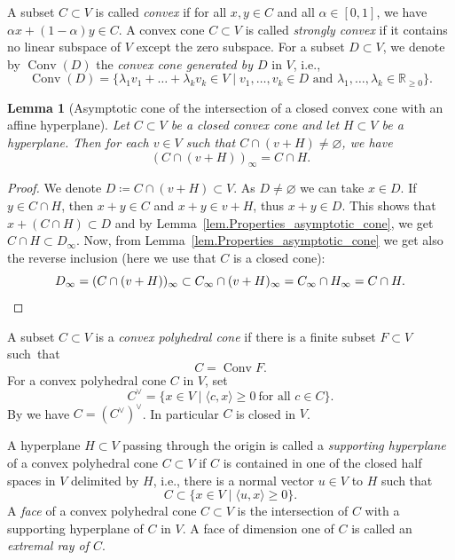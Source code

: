 \documentclass[11pt]{article}
\newcommand{\ie}{i.e.,\xspace}
\numberwithin{equation}{section}
\let\oldvee\vee
\renewcommand{\vee}{{\scriptscriptstyle\oldvee}}
\theoremstyle{plain}
\newtheorem{lemma}[theorem]{Lemma}
\theoremstyle{definition}
\DeclareMathOperator{\Conv}{Conv}
\newcommand{\RR}{\mathbb{R}}
\newcommand{\set}[2]{\{#1 \mid #2\}}
\begin{document}
A subset $C \subset V$ is called \emph{convex} if for all
$x, y \in C$ and all $\alpha \in [0, 1]$, we have $\alpha x + (1- \alpha) y \in C$.
A convex cone $C \subset V$ is called \emph{strongly convex} if
it contains no linear subspace of $V$ except the zero subspace.
For a
subset $D \subset V$, we denote by $\Conv(D)$ the
\emph{convex cone generated by $D$} in $V$, \ie
\[
\Conv(D) = \set{\lambda_1 v_1 + \ldots + \lambda_k v_k \in V}{
\textrm{$v_1, \ldots, v_k \in D$ and $\lambda_1, \ldots, \lambda_k \in \RR_{\geq 0}$}}.
\]

\begin{lemma}[Asymptotic cone of the intersection of a closed convex
cone with an affine hyperplane]
\label{lem.Weights_facet_translated}
Let $C \subset V$ be a closed convex cone and let
$H \subset V$ be a hyperplane. Then for each $v \in V$ such that $C \cap (v+H) \neq \varnothing$, we have
\[
\left( C \cap (v+H) \right)_{\infty} = C \cap H.
\]
\end{lemma}

\begin{proof}
We denote $D \coloneqq C \cap (v+H) \subset V$. As
$D \neq \varnothing$ we can take $x \in D$. If~$y \in C \cap H$, then
$x+y \in C$ and $x+y \in v + H$, thus $x+y \in D$. This shows that
$x + (C \cap H) \subset D$ and by Lemma~\ref{lem.Properties_asymptotic_cone}, we get $C \cap H \subset D_\infty$.
Now, from Lemma~\ref{lem.Properties_asymptotic_cone} we get also the reverse inclusion
(here we use that $C$ is a closed cone):
\[
D_\infty = (C \cap (v+H))_\infty \subset C_\infty \cap (v+H)_\infty
= C_\infty \cap H_{\infty} = C \cap H.\qedhere
\]
\end{proof}

A subset $C\!\subset\!V$ is a \emph{convex polyhedral cone} if there is a finite subset
$F\!\subset\!V$ such~that
\[
C = \Conv F.
\]
For a convex polyhedral cone $C$ in $V$, set
\[
C^\vee = \set{x \in V}{\langle c, x \rangle\geq 0 \ \textrm{for all $c \in C$}}.
\]
By \cite[Propty\,(1), p.\,9]{Fu1993Introduction-to-to} we have $C = (C^\vee)^\vee$.
In particular $C$ is closed in $V$.

A hyperplane $H \subset V$ passing through the origin is called a \emph{supporting hyperplane} of a convex polyhedral cone
$C \subset V$ if
$C$ is contained in one of the closed half spaces in $V$
delimited by $H$, \ie there is a normal vector $u \in V$ to $H$
such that
\[
C \subset \set{x \in V}{\langle u, x \rangle\geq 0}.
\]
A \emph{face} of a convex polyhedral cone $C \subset V$ is the intersection of $C$ with a
supporting hyperplane of $C$ in $V$.
A face of dimension one of $C$ is called an \emph{extremal ray of $C$}.
\end{document}
